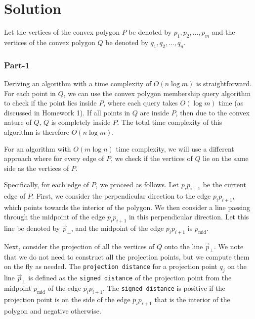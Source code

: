 \documentclass[12pt]{article}
\begin{document}
\section*{Solution}
Let the vertices of the convex polygon \( P \) be denoted by \( p_1, p_2, \ldots, p_m \) and the vertices of the convex polygon \( Q \) be denoted by \( q_1, q_2, \ldots, q_n \).

\subsubsection*{Part-1}

Deriving an algorithm with a time complexity of \( O(n \log m) \) is straightforward. For each point in \( Q \), we can use the convex polygon membership query algorithm to check if the point lies inside \( P \), where each query takes \( O(\log m) \) time (as discussed in Homework 1). If all points in \( Q \) are inside \( P \), then due to the convex nature of \( Q \), \( Q \) is completely inside \( P \). The total time complexity of this algorithm is therefore \( O(n \log m) \).

For an algorithm with \( O(m \log n) \) time complexity, we will use a different approach where for every edge of \( P \), we check if the vertices of \( Q \) lie on the same side as the vertices of \( P \).

Specifically, for each edge of \( P \), we proceed as follows. Let \( p_i p_{i+1} \) be the current edge of \( P \). First, we consider the perpendicular direction to the edge \( p_i p_{i+1} \), which points towards the interior of the polygon. We then consider a line passing through the midpoint of the edge \( p_i p_{i+1} \) in this perpendicular direction. Let this line be denoted by \( \vec{p}_{\perp} \), and the midpoint of the edge \( p_i p_{i+1} \) is \( p_{\text{mid}} \).

Next, consider the projection of all the vertices of \( Q \) onto the line \( \vec{p}_{\perp} \). We note that we do not need to construct all the projection points, but we compute them on the fly as needed. The \texttt{projection distance} for a projection point \( q_j \) on the line \( \vec{p}_{\perp} \) is defined as the \texttt{signed distance} of the projection point from the midpoint \( p_{\text{mid}} \) of the edge \( p_i p_{i+1} \). The \texttt{signed distance} is positive if the projection point is on the side of the edge \( p_i p_{i+1} \) that is the interior of the polygon and negative otherwise.
\end{document}
